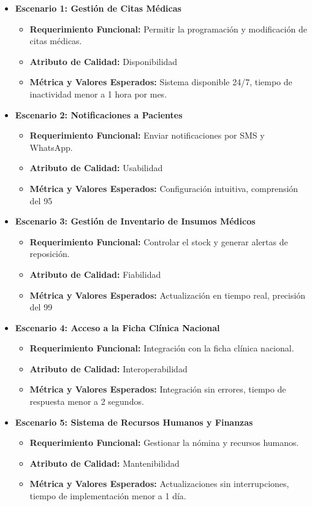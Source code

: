 \begin{itemize}
    \item \textbf{Escenario 1: Gestión de Citas Médicas}
    \begin{itemize}
        \item \textbf{Requerimiento Funcional:} Permitir la programación y modificación de citas médicas.
        \item \textbf{Atributo de Calidad:} Disponibilidad
        \item \textbf{Métrica y Valores Esperados:} Sistema disponible 24/7, tiempo de inactividad menor a 1 hora por mes.
    \end{itemize}
    \item \textbf{Escenario 2: Notificaciones a Pacientes}
    \begin{itemize}
        \item \textbf{Requerimiento Funcional:} Enviar notificaciones por SMS y WhatsApp.
        \item \textbf{Atributo de Calidad:} Usabilidad
        \item \textbf{Métrica y Valores Esperados:} Configuración intuitiva, comprensión del 95%
    \end{itemize}
    \item \textbf{Escenario 3: Gestión de Inventario de Insumos Médicos}
    \begin{itemize}
        \item \textbf{Requerimiento Funcional:} Controlar el stock y generar alertas de reposición.
        \item \textbf{Atributo de Calidad:} Fiabilidad
        \item \textbf{Métrica y Valores Esperados:} Actualización en tiempo real, precisión del 99%
    \end{itemize}
    \item \textbf{Escenario 4: Acceso a la Ficha Clínica Nacional}
    \begin{itemize}
        \item \textbf{Requerimiento Funcional:} Integración con la ficha clínica nacional.
        \item \textbf{Atributo de Calidad:} Interoperabilidad
        \item \textbf{Métrica y Valores Esperados:} Integración sin errores, tiempo de respuesta menor a 2 segundos.
    \end{itemize}
    \item \textbf{Escenario 5: Sistema de Recursos Humanos y Finanzas}
    \begin{itemize}
        \item \textbf{Requerimiento Funcional:} Gestionar la nómina y recursos humanos.
        \item \textbf{Atributo de Calidad:} Mantenibilidad
        \item \textbf{Métrica y Valores Esperados:} Actualizaciones sin interrupciones, tiempo de implementación menor a 1 día.
    \end{itemize}
\end{itemize}
